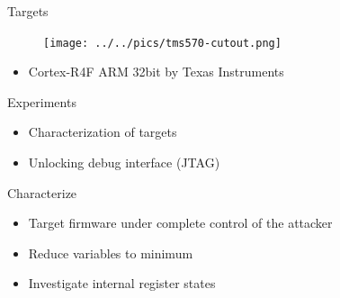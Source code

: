 \documentclass[table]{beamer}
\begin{document}
\begin{frame}[t]{Targets}
    \begin{figure}[H]
      \centering
      \texttt{[image: ../../pics/tms570-cutout.png]}
    \end{figure}

    \begin{itemize}
        \item Cortex-R4F ARM 32bit by Texas Instruments
    \end{itemize}
\end{frame}

\begin{frame}{Experiments}
    \begin{itemize}
        \item Characterization of targets
        \item Unlocking debug interface (JTAG)
    \end{itemize}
\end{frame}

\begin{frame}{Characterize}
    \begin{itemize}
        \item Target firmware under complete control of the attacker
    \end{itemize}

    \begin{itemize}
        \item Reduce variables to minimum
        \item Investigate internal register states
    \end{itemize}
\end{frame}

\end{document}

